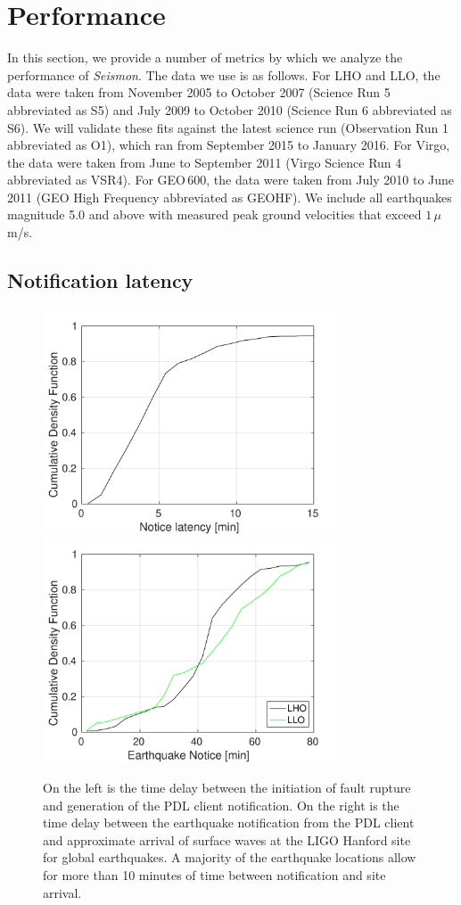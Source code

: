 \documentclass[twocolumn, aps, superscriptaddress]{revtex4}
\begin{document}
\section{Performance}
\label{sec:performance}

In this section, we provide a number of metrics by which we analyze the performance of \emph{Seismon}. The data we use is as follows. For LHO and LLO, the data were taken from November 2005 to October 2007 (Science Run 5 abbreviated as S5) and July 2009 to October 2010 (Science Run 6 abbreviated as S6). We will validate these fits against the latest science run (Observation Run 1 abbreviated as O1), which ran from September 2015 to January 2016. For Virgo, the data were taken from June to September 2011 (Virgo Science Run 4 abbreviated as VSR4). For GEO\,600, the data were taken from July 2010 to June 2011 (GEO High Frequency abbreviated as GEOHF). We include all earthquakes magnitude 5.0 and above with measured peak ground velocities that exceed $1\,\mu$m/s.

\subsection{Notification latency}

\begin{figure}[t]
\hspace*{-0.5cm}
 \includegraphics[width=3.5in]{earthquake_notice.pdf}
 \includegraphics[width=3.5in]{lockloss_notice.pdf}
 \caption{On the left is the time delay between the initiation of fault rupture and generation of the PDL client notification. On the right is the time delay between the earthquake notification from the PDL client and approximate arrival of surface waves at the LIGO Hanford site for global earthquakes. A majority of the earthquake locations allow for more than 10 minutes of time between notification and site arrival.}
 \label{fig:delays}
\end{figure}
\end{document}
